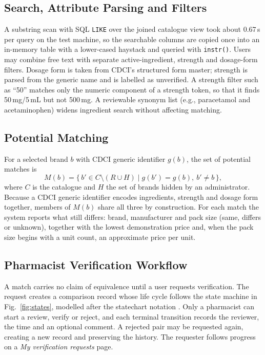 \documentclass[11pt,a4paper]{article}
\begin{document}
\subsection{Search, Attribute Parsing and Filters}
A substring scan with SQL \texttt{LIKE} over the joined catalogue view took about 0.67\,s per query on the test machine, so the searchable columns are copied once into an in-memory table with a lower-cased haystack and queried with \texttt{instr()}. Users may combine free text with separate active-ingredient, strength and dosage-form filters. Dosage form is taken from CDCI's structured form master; strength is parsed from the generic name and is labelled as unverified. A strength filter such as ``50'' matches only the numeric component of a strength token, so that it finds 50\,mg/5\,mL but not 500\,mg. A reviewable synonym list (e.g., paracetamol and acetaminophen) widens ingredient search without affecting matching.

\subsection{Potential Matching}
For a selected brand $b$ with CDCI generic identifier $g(b)$, the set of potential matches is
\begin{equation}
M(b)=\{\,b' \in C\setminus(R\cup H) \mid g(b')=g(b),\ b'\neq b\,\},
\label{eq:match}
\end{equation}
where $C$ is the catalogue and $H$ the set of brands hidden by an administrator. Because a CDCI generic identifier encodes ingredients, strength and dosage form together, members of $M(b)$ share all three by construction. For each match the system reports what still differs: brand, manufacturer and pack size (same, differs or unknown), together with the lowest demonstration price and, when the pack size begins with a unit count, an approximate price per unit.

\subsection{Pharmacist Verification Workflow}
A match carries no claim of equivalence until a user requests verification. The request creates a comparison record whose life cycle follows the state machine in Fig.~\ref{fig:states}, modelled after the statechart notation \cite{harel1987}. Only a pharmacist can start a review, verify or reject, and each terminal transition records the reviewer, the time and an optional comment. A rejected pair may be requested again, creating a new record and preserving the history. The requester follows progress on a \emph{My verification requests} page.
\end{document}
